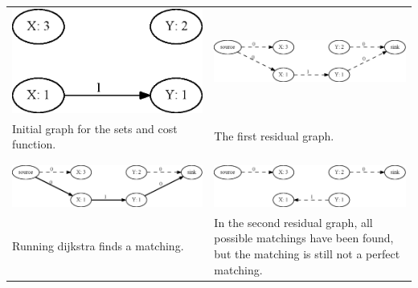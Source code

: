\documentclass[11pt]{article}
\begin{document}
\begingroup
    \fontsize{7pt}{10pt}\selectfont
\begin{tabular}{ p{5.5cm} | p{5.5cm} }
	\includegraphics[scale=0.3]{drawings/eps/TwoWayCostMatchingNotPerfect/1it0.eps} &
    \includegraphics[scale=0.3]{drawings/eps/TwoWayCostMatchingNotPerfect/1it1.eps} \\
	Initial graph for the sets and cost function. &
    The first residual graph. \\ \\ \hline \\

    \includegraphics[scale=0.3]{drawings/eps/TwoWayCostMatchingNotPerfect/1it2.eps} &
    \includegraphics[scale=0.3]{drawings/eps/TwoWayCostMatchingNotPerfect/1it3.eps} \\
	Running dijkstra finds a matching. &
	In the second residual graph, all possible matchings have been found, but the matching is still not a perfect matching. \\ 
\end{tabular}
\end{document}
